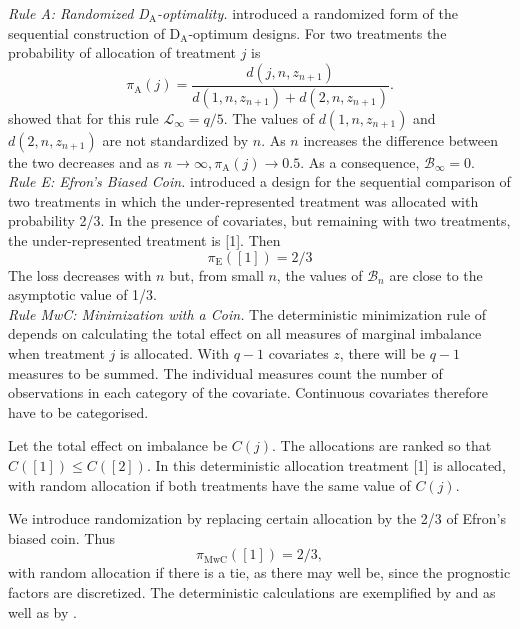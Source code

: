 \documentclass[number,12pt,review]{elsarticle}
\begin{document}
{\it Rule A: Randomized D$_{\text{A}}$-optimality.}  \citet{aca:82} introduced a randomized form of the sequential construction of D$_{\text{A}}$-optimum designs. For two treatments the probability of allocation of treatment $j$ is
\begin{equation}
\pi_{\text{A}}(j) = \dfrac{d(j,n,z_{n+1})}{d(1,n,z_{n+1})+d(2,n,z_{n+1})}.
\label{DArandom}
\end{equation}
\citet{bur:96} showed that for this rule $\mathcal{L}_{\infty} = q/5$. The values of $d(1,n,z_{n+1})$ and $d(2,n,z_{n+1})$ are not standardized by $n$. As $n$ increases the difference between the two decreases and as $n \rightarrow \infty, \pi_{\text{A}}(j) \rightarrow 0.5$. As a consequence, $\mathcal{B}_{\infty} =0$. \\

{\it Rule E: Efron's Biased Coin.} \citet{efr:71} introduced a design for the sequential comparison of two treatments in which the under-represented treatment was allocated with probability 2/3. In the presence of covariates, but remaining with two treatments, the under-represented treatment is [1]. Then
\begin{equation}
\pi_{\text{E}}([1]) = 2/3
\label{bradsrule}
\end{equation}
The loss decreases with $n$ but, from small $n$, the values of $\mathcal{B}_n$ are close to the asymptotic value of 1/3.\\

{\it Rule MwC: Minimization with a Coin.}  The deterministic minimization rule of \cite{p+s:75} depends on calculating the total effect on all  measures of marginal imbalance when treatment $j$ is allocated. With $q-1$ covariates $z$, there will be $q-1$ measures to be summed. The individual measures count the number of observations in each category of the covariate. Continuous covariates therefore have to be categorised.

Let the total effect on imbalance be $C(j)$. The allocations are ranked so that $C([1]) \le  C([2])$.
In this deterministic allocation treatment [1] is allocated, with random allocation if both treatments have the
same  value of $C(j)$.

We introduce randomization by replacing certain allocation by the 2/3 of Efron's biased coin. Thus
\begin{equation}
\pi_{\text{MwC}}([1]) = 2/3,
\label{MinwCoin}
\end{equation}
with random allocation if there is a tie, as there may well be, since the prognostic factors are discretized.
The deterministic calculations are exemplified by \cite{senn+val:2010} and \cite{aca:2002} as well as by \cite{p+s:75}.\\
\end{document}
